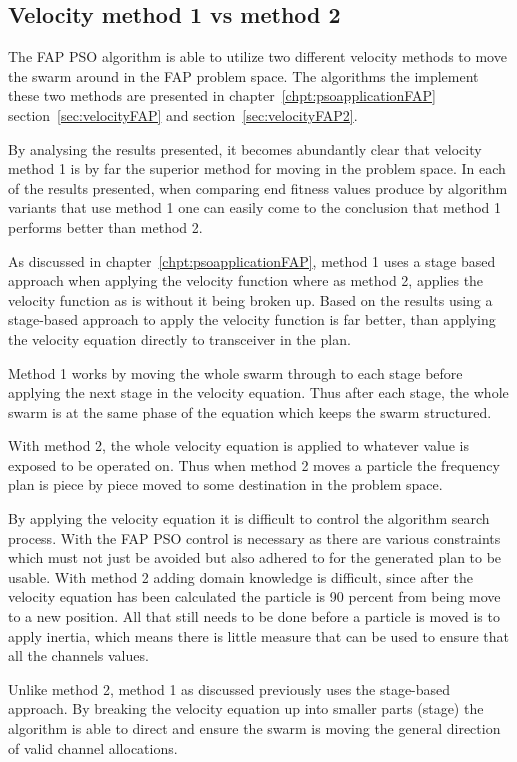 \subsection{Velocity method 1 vs method 2}
The FAP PSO algorithm is able to utilize two different velocity methods to move the swarm around in the FAP problem space. The algorithms the implement these two methods are presented in chapter~\ref{chpt:psoapplicationFAP} section~\ref{sec:velocityFAP} and section~\ref{sec:velocityFAP2}.

By analysing the results presented, it becomes abundantly clear that velocity method 1 is by far the superior method for moving in the problem space. In each of the results presented, when comparing end fitness values produce by algorithm variants that use method 1 one can easily come to the conclusion that method 1 performs better than method 2.

As discussed in chapter~\ref{chpt:psoapplicationFAP}, method 1 uses a stage based approach when applying the velocity function where as method 2, applies the velocity function as is without it being broken up. Based on the results using a stage-based approach to apply the velocity function is far better, than applying the velocity equation directly to transceiver in the plan.

Method 1 works by moving the whole swarm through to each stage before applying the next stage in the velocity equation. Thus after each stage, the whole swarm is at the same phase of the equation which keeps the swarm structured.

With method 2, the whole velocity equation is applied to whatever value is exposed to be operated on. Thus when method 2 moves a particle the frequency plan is piece by piece moved to some destination in the problem space.

By applying the velocity equation it is difficult to control the algorithm search process. With the FAP PSO control is necessary as there are various constraints which must not just be avoided but also adhered to for the generated plan to be usable. With method 2 adding domain knowledge is difficult, since after the velocity equation has been calculated the particle is 90 percent from being move to a new position. All that still needs to be done before a particle is moved is to apply inertia, which means there is little measure that can be used to ensure that all the channels values.

Unlike method 2, method 1 as discussed previously uses the stage-based approach. By breaking the velocity equation up into smaller parts (stage) the algorithm is able to direct and ensure the swarm is moving the general direction of valid channel allocations.

